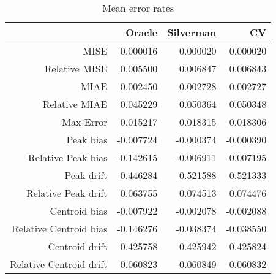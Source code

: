 \begin{table}[ht]
\centering
\begin{tabular}{rrrr}
  \hline
 & Oracle & Silverman & CV \\ 
  \hline
MISE & 0.000016 & 0.000020 & 0.000020 \\ 
  Relative MISE & 0.005500 & 0.006847 & 0.006843 \\ 
  MIAE & 0.002450 & 0.002728 & 0.002727 \\ 
  Relative MIAE & 0.045229 & 0.050364 & 0.050348 \\ 
  Max Error & 0.015217 & 0.018315 & 0.018306 \\ 
  Peak bias & -0.007724 & -0.000374 & -0.000390 \\ 
  Relative Peak bias & -0.142615 & -0.006911 & -0.007195 \\ 
  Peak drift & 0.446284 & 0.521588 & 0.521333 \\ 
  Relative Peak drift & 0.063755 & 0.074513 & 0.074476 \\ 
  Centroid bias & -0.007922 & -0.002078 & -0.002088 \\ 
  Relative Centroid bias & -0.146276 & -0.038374 & -0.038550 \\ 
  Centroid drift & 0.425758 & 0.425942 & 0.425824 \\ 
  Relative Centroid drift & 0.060823 & 0.060849 & 0.060832 \\ 
   \hline
\end{tabular}
\caption{Mean error rates} 
\label{tbl:mean_error_rates}
\end{table}
